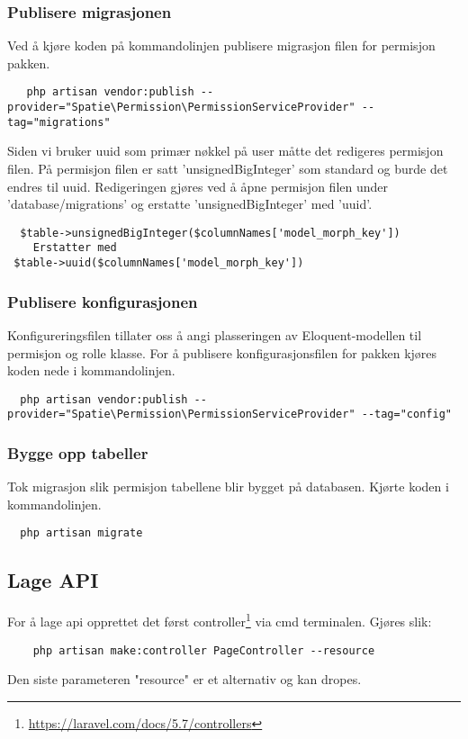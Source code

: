 \subsubsection{Publisere migrasjonen}
Ved å kjøre koden på kommandolinjen publisere migrasjon filen for permisjon pakken.
\begin{lstlisting}
   php artisan vendor:publish --provider="Spatie\Permission\PermissionServiceProvider" --tag="migrations" 
\end{lstlisting}

Siden vi bruker uuid som primær nøkkel på user måtte det redigeres permisjon filen. På permisjon filen er satt 'unsignedBigInteger' som standard og burde det  endres  til uuid. Redigeringen gjøres ved å åpne permisjon filen  under 'database/migrations' og erstatte 'unsignedBigInteger' med 'uuid'.
\begin{lstlisting}
  $table->unsignedBigInteger($columnNames['model_morph_key'])
    Erstatter med 
 $table->uuid($columnNames['model_morph_key'])
\end{lstlisting}

\subsubsection{Publisere konfigurasjonen}
Konfigureringsfilen tillater oss å angi plasseringen av Eloquent-modellen til permisjon og rolle klasse.
For å publisere konfigurasjonsfilen for pakken kjøres koden nede i kommandolinjen.

\begin{lstlisting}
  php artisan vendor:publish --provider="Spatie\Permission\PermissionServiceProvider" --tag="config"
\end{lstlisting}

\subsubsection{Bygge opp tabeller}
Tok migrasjon slik permisjon tabellene blir bygget på databasen.
Kjørte koden i kommandolinjen.
\begin{lstlisting}
  php artisan migrate
\end{lstlisting}

\subsection{Lage API}
For å lage api opprettet det først controller\footnote{\url{https://laravel.com/docs/5.7/controllers}} via cmd terminalen.
Gjøres slik:
\begin{lstlisting}
    php artisan make:controller PageController --resource
\end{lstlisting}
Den siste parameteren "resource" er et alternativ og kan dropes.

